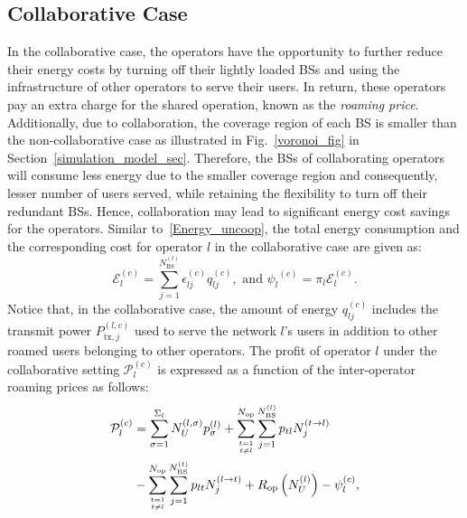 \documentclass[10pt, letter, twocolumn]{IEEEtran}
\begin{document}
\subsection{Collaborative Case} \label{sec5}
In the collaborative case, the operators have the opportunity to further reduce their energy costs by turning off their lightly loaded BSs and using the infrastructure of other operators to serve their users. In return, these operators pay an extra charge for the shared operation, known as the \emph{roaming price}. Additionally, due to collaboration, the coverage region of each BS is smaller than the non-collaborative case as illustrated in Fig.~\ref{voronoi_fig} in Section~\ref{simulation_model_sec}. Therefore, the BSs of collaborating operators will consume less energy due to the smaller coverage region and consequently, lesser number of users served, while retaining the flexibility to turn off their redundant BSs. Hence, collaboration may lead to significant energy cost savings for the operators. Similar to~\eqref{Energy_uncoop}, the total energy consumption and the corresponding cost for operator $l$ in the collaborative case are given as:
\begin{equation}
{\mathcal E}_{l}^{(c)}=\sum_{j=1}^{N_{\mathrm{BS}}^{(l)}}\epsilon^{(c)}_{lj} q_{lj}^{(c)},\mbox{ and }
{\mathcal \psi_{l}}^{(c)}=\pi_l{\mathcal E}_{l}^{(c)}.
\label{Energy_coop}
\end{equation}
Notice that, in the collaborative case, the amount of energy $q_{lj}^{(c)}$ includes the transmit power $P^{(l,c)}_{\text{tx},j} $ used to serve the network $l$'s users in addition to other roamed users belonging to other operators. The profit of operator $l$ under the collaborative setting ${\mathcal P}_l^{(c)}$ is expressed as a function of the inter-operator roaming prices as follows:
\begin{align}
{\mathcal P}_l^{(c)}&=\sum_{\sigma=1}^{\Sigma_l}N_U^{(l,\sigma)} p^{(l)}_\sigma+\sum_{t=1\atop  t\neq l}^{{N_{\text{op}}}}\sum_{j=1}^{N_{\text{BS}}^{(l)}} p_{tl} N_{j}^{(t \rightarrow l)}\nonumber\\
& - \sum_{t=1\atop  t\neq l}^{{N_{\text{op}}}}\sum_{j=1}^{N_{\text{BS}}^{(t)}}p_{lt} N_{j}^{(l \rightarrow t)}+R_{\mathrm{op}}\left(N_U^{(l)}\right)-\psi_{l}^{(c)},
\label{profit_coop_eq}
\end{align}
\end{document}
